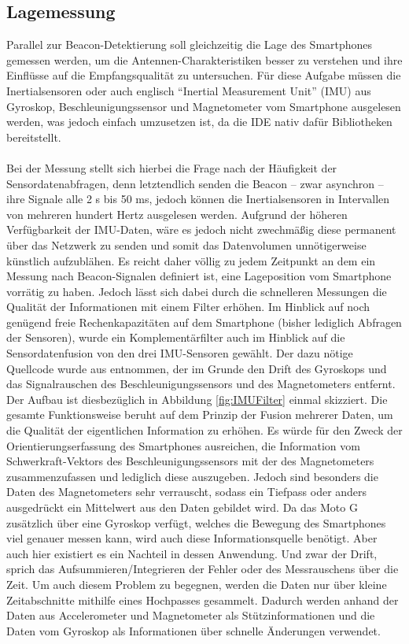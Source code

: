 \subsection{Lagemessung}
Parallel zur Beacon-Detektierung soll gleichzeitig die Lage des Smartphones gemessen werden, um die Antennen-Charakteristiken besser zu verstehen und ihre Einflüsse auf die Empfangsqualität zu untersuchen. Für diese Aufgabe müssen die Inertialsensoren oder auch englisch "`Inertial Measurement Unit"' (IMU) aus Gyroskop, Beschleunigungssensor und Magnetometer vom Smartphone ausgelesen werden, was jedoch einfach umzusetzen ist, da die IDE nativ dafür Bibliotheken bereitstellt. \\ \\
Bei der Messung stellt sich hierbei die Frage nach der Häufigkeit der Sensordatenabfragen, denn letztendlich senden die Beacon -- zwar asynchron -- ihre Signale alle 2 s bis 50 ms, jedoch können die Inertialsensoren in Intervallen von mehreren hundert Hertz ausgelesen werden. Aufgrund der höheren Verfügbarkeit der IMU-Daten, wäre es jedoch nicht zwechmäßig diese permanent über das Netzwerk zu senden und somit das Datenvolumen unnötigerweise künstlich aufzublähen. Es reicht daher völlig zu jedem Zeitpunkt an dem ein Messung nach Beacon-Signalen definiert ist, eine Lageposition vom Smartphone vorrätig zu haben. Jedoch lässt sich dabei durch die schnelleren Messungen die Qualität der Informationen mit einem Filter erhöhen. Im Hinblick auf noch genügend freie Rechenkapazitäten auf dem Smartphone (bisher lediglich Abfragen der Sensoren), wurde ein Komplementärfilter auch im Hinblick auf die Sensordatenfusion von den drei IMU-Sensoren gewählt. Der dazu nötige Quellcode wurde aus \cite{IMUFilter} entnommen, der im Grunde den Drift des Gyroskops und das Signalrauschen des Beschleunigungssensors und des Magnetometers entfernt. Der Aufbau ist diesbezüglich in Abbildung \ref{fig:IMUFilter} einmal skizziert. Die gesamte Funktionsweise beruht auf dem Prinzip der Fusion mehrerer Daten, um die Qualität der eigentlichen Information zu erhöhen. Es würde für den Zweck der Orientierungserfassung des Smartphones ausreichen, die Information vom Schwerkraft-Vektors des Beschleunigungssensors mit der des Magnetometers zusammenzufassen und lediglich diese auszugeben. Jedoch sind besonders die Daten des Magnetometers sehr verrauscht, sodass ein Tiefpass oder anders ausgedrückt ein Mittelwert aus den Daten gebildet wird. Da das Moto G zusätzlich über eine Gyroskop verfügt, welches die Bewegung des Smartphones viel genauer messen kann, wird auch diese Informationsquelle benötigt. Aber auch hier existiert es ein Nachteil in dessen Anwendung. Und zwar der Drift, sprich das Aufsummieren/Integrieren der Fehler oder des Messrauschens über die Zeit. Um auch diesem Problem zu begegnen, werden die Daten nur über kleine Zeitabschnitte mithilfe eines Hochpasses gesammelt. Dadurch werden anhand der Daten aus Accelerometer und Magnetometer als Stützinformationen und die Daten vom Gyroskop als Informationen über schnelle Änderungen verwendet. 
